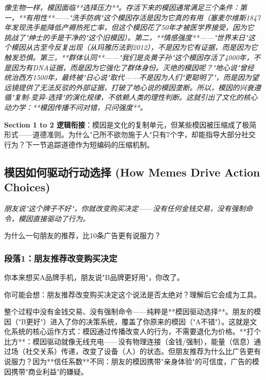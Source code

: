 \documentclass[a4paper,12pt]{book}
\newenvironment{motivation}{\begin{tcolorbox}[colback=gray!10,colframe=gray!60,title=\textit{本章动机},fonttitle=\bfseries,arc=0mm,leftrule=3mm]\small\itshape}{\end{tcolorbox}}
\newenvironment{questionbox}{\begin{tcolorbox}[colback=red!3!white,colframe=red!60!black]}{\end{tcolorbox}}
\begin{document}
\begin{motivation}
\begin{motivation}
\begin{motivation}
像生物一样，模因面临**选择压力**。存活下来的模因通常满足三个条件：第一，**有用性**——"洗手防病"这个模因存活是因为它真的有用（塞麦尔维斯1847年发现洗手能降低产褥热死亡率，但这个模因花了50年才被医学界接受，因为它挑战了"绅士的手是干净的"这个旧模因）。第二，**情感强度**——"世界末日"这个模因从古至今反复出现（从玛雅历法到2012），不是因为它有证据，而是因为它触发恐惧。第三，**群体认同**——"我们是炎黄子孙"这个模因存活了4000年，不是因为有DNA证据，而是因为它强化了群体身份。灭绝的模因呢？"地心说"曾经统治西方1500年，最终被"日心说"取代——不是因为人们"更聪明了"，而是因为望远镜提供了无法反驳的外部证据，打破了地心说的模因垄断。所以，模因的兴衰遵循"复制-变异-选择"的演化规律，不依赖人类的理性判断。这就引出了文化的核心动力学：**模因传播不问对错，只问强度**。

	\textbf{Section 1 to 2 逻辑衔接}：模因是文化的复制单元，但某些模因被压缩成了极简形式——道德准则。为什么"己所不欲勿施于人"只有7个字，却能指导大部分社交行为？下一节追踪道德作为短编码的压缩机制。

	
	\subsection{模因如何驱动行动选择 (How Memes Drive Action Choices)}
	\begin{motivation}
		朋友说"这个牌子不好"，你就改变购买决定——没有任何金钱交易，没有强制命令，模因直接驱动了行为。
	\end{motivation}
	\begin{questionbox}
		为什么一句朋友的推荐，比10条广告更有说服力？
	\end{questionbox}

	\subsubsection*{段落1：朋友推荐改变购买决定}
	你本来想买A品牌手机，朋友说"B品牌更好用"，你改了。
	\begin{tcolorbox}[colback=yellow!5, title=\textit{读者行为预测}]
		你可能会想：朋友推荐改变购买决定这个说法是否太绝对？理解后它会成为工具。
	\end{tcolorbox}

整个过程中没有金钱交易、没有强制命令——纯粹是**模因驱动选择**。朋友的模因（"B更好"）进入了你的决策系统，覆盖了你原来的模因（"A不错"）。这就是文化系统的核心运作方式：模因通过传播改变人的行为，不需要退化为价格。**打个比方**：模因驱动就像无线充电——没有物理连接（金钱/强制），能量（信息）通过场（社交关系）传递，改变了设备（人）的状态。但朋友推荐为什么比广告更有说服力？因为**信任系数**不同：朋友的模因携带"亲身体验"的可信度，广告的模因携带"商业利益"的嫌疑。


\end{motivation}
\end{motivation}
\end{motivation}
\end{document}
